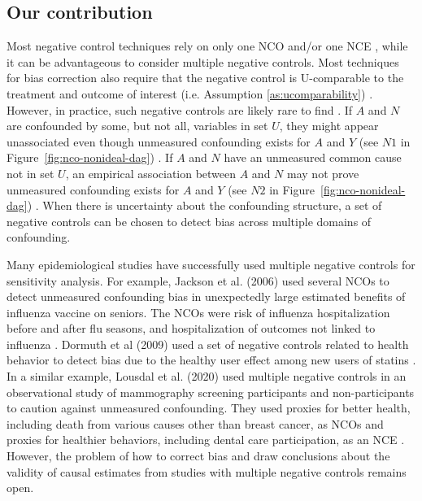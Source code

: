 \subsection{Our contribution}

Most negative control techniques rely on only one NCO and/or one NCE \cite{tchetgen2014control, sofer2016negative, flanders2017new, miao2018identifying, shi2020multiply}, while it can be advantageous to consider multiple negative controls.
Most techniques for bias correction also require that the negative control is U-comparable to the treatment and outcome of interest (i.e. Assumption \ref{as:ucomparability}) \cite{tchetgen2014control, flanders2017new, miao2018identifying, shi2020multiply}.
However, in practice, such negative controls are likely rare to find \cite{lipsitch2010negative}.
If $A$ and $N$ are confounded by some, but not all, variables in set $U$, they might appear unassociated even though unmeasured confounding exists for $A$ and $Y$ (see $N1$ in Figure~\ref{fig:nco-nonideal-dag}) \cite{lipsitch2010negative}. If $A$ and $N$ have an unmeasured common cause not in set $U$, an empirical association between $A$ and $N$ may not prove unmeasured confounding exists for $A$ and $Y$ (see $N2$ in Figure~\ref{fig:nco-nonideal-dag}) \cite{lipsitch2010negative}. When there is uncertainty about the confounding structure, a set of negative controls can be chosen to detect bias across multiple domains of confounding.

Many epidemiological studies have successfully used multiple negative controls for sensitivity analysis. For example, Jackson et al. (2006) used several NCOs to detect unmeasured confounding bias in unexpectedly large estimated benefits of influenza vaccine on seniors. The NCOs were risk of influenza hospitalization before and after flu seasons, and hospitalization of outcomes not linked to influenza \cite{jackson2006evidence}. Dormuth et al (2009) used a set of negative controls related to health behavior to detect bias due to the healthy user effect among new users of statins \cite{dormuth2009statin}. In a similar example, Lousdal et al. (2020) used multiple negative controls in an observational study of mammography screening participants and non-participants to caution against unmeasured confounding. They used proxies for better health, including death from various causes other than breast cancer, as NCOs and proxies for healthier behaviors, including dental care participation, as an NCE \cite{lousdal2020negative}. However, the problem of how to correct bias and draw conclusions about the validity of causal estimates from studies with multiple negative controls remains open.

